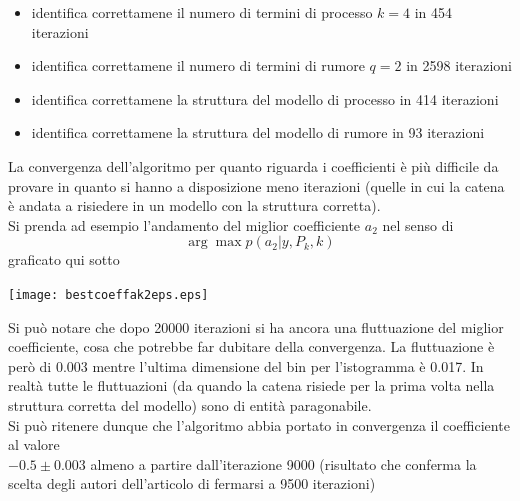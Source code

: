 \documentclass[10pt,a4paper,oneside,openany,noindent]{report}
\begin{document}
\begin{itemize}
\item identifica correttamene il numero di termini di processo $k=4$  in 454 iterazioni
\item identifica correttamene il numero di termini di rumore $q=2$  in 2598 iterazioni
\item identifica correttamene la struttura del modello di processo  in 414 iterazioni
\item identifica correttamene la struttura del modello di rumore  in 93 iterazioni
\end{itemize}
La convergenza dell'algoritmo per quanto riguarda i coefficienti è più difficile da provare in quanto si hanno a disposizione meno iterazioni (quelle in cui la catena è andata a risiedere in un modello con la struttura corretta).\\
Si prenda ad esempio l'andamento del miglior coefficiente $a_2$ nel senso di
\[\arg \max p(a_2|y,P_k,k)\] graficato qui sotto
\begin{center}
\texttt{[image: bestcoeffak2eps.eps]} 
\end{center}
Si può notare che  dopo 20000 iterazioni si ha ancora una fluttuazione del miglior coefficiente, cosa che potrebbe far dubitare della convergenza. La fluttuazione è però di 0.003 mentre l'ultima dimensione del bin per l'istogramma è 0.017. In realtà tutte le fluttuazioni (da quando la catena risiede per la prima volta nella struttura corretta del modello) sono di entità paragonabile.\\
Si può ritenere dunque che l'algoritmo abbia portato in convergenza il coefficiente al valore\\ $-0.5\pm 0.003$ almeno a partire dall'iterazione 9000 (risultato che conferma la scelta degli autori dell'articolo di fermarsi a 9500 iterazioni)
\end{document}
